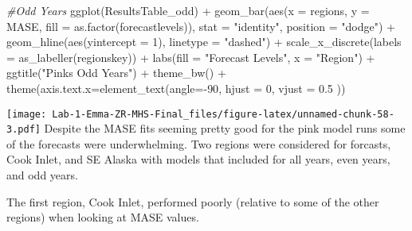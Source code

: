 \documentclass[
]{article}
\newenvironment{Shaded}{\begin{snugshade}}{\end{snugshade}}
\newcommand{\AttributeTok}[1]{\textcolor[rgb]{0.77,0.63,0.00}{#1}}
\newcommand{\CommentTok}[1]{\textcolor[rgb]{0.56,0.35,0.01}{\textit{#1}}}
\newcommand{\DecValTok}[1]{\textcolor[rgb]{0.00,0.00,0.81}{#1}}
\newcommand{\FloatTok}[1]{\textcolor[rgb]{0.00,0.00,0.81}{#1}}
\newcommand{\FunctionTok}[1]{\textcolor[rgb]{0.00,0.00,0.00}{#1}}
\newcommand{\NormalTok}[1]{#1}
\newcommand{\SpecialCharTok}[1]{\textcolor[rgb]{0.00,0.00,0.00}{#1}}
\newcommand{\StringTok}[1]{\textcolor[rgb]{0.31,0.60,0.02}{#1}}
\begin{document}
\begin{Shaded}
\begin{Highlighting}[]
\CommentTok{\#Odd Years }
\FunctionTok{ggplot}\NormalTok{(ResultsTable\_odd) }\SpecialCharTok{+} 
  \FunctionTok{geom\_bar}\NormalTok{(}\FunctionTok{aes}\NormalTok{(}\AttributeTok{x =}\NormalTok{ regions, }\AttributeTok{y =}\NormalTok{ MASE, }\AttributeTok{fill =} \FunctionTok{as.factor}\NormalTok{(forecastlevels)), }\AttributeTok{stat =} \StringTok{"identity"}\NormalTok{, }\AttributeTok{position =} \StringTok{"dodge"}\NormalTok{) }\SpecialCharTok{+} 
  \FunctionTok{geom\_hline}\NormalTok{(}\FunctionTok{aes}\NormalTok{(}\AttributeTok{yintercept =} \DecValTok{1}\NormalTok{), }\AttributeTok{linetype =} \StringTok{"dashed"}\NormalTok{) }\SpecialCharTok{+} 
  \FunctionTok{scale\_x\_discrete}\NormalTok{(}\AttributeTok{labels =} \FunctionTok{as\_labeller}\NormalTok{(regionskey)) }\SpecialCharTok{+}
  \FunctionTok{labs}\NormalTok{(}\AttributeTok{fill =} \StringTok{"Forecast Levels"}\NormalTok{, }\AttributeTok{x =} \StringTok{"Region"}\NormalTok{) }\SpecialCharTok{+} 
  \FunctionTok{ggtitle}\NormalTok{(}\StringTok{"Pinks Odd Years"}\NormalTok{) }\SpecialCharTok{+} \FunctionTok{theme\_bw}\NormalTok{() }\SpecialCharTok{+} \FunctionTok{theme}\NormalTok{(}\AttributeTok{axis.text.x=}\FunctionTok{element\_text}\NormalTok{(}\AttributeTok{angle=}\SpecialCharTok{{-}}\DecValTok{90}\NormalTok{, }\AttributeTok{hjust =} \DecValTok{0}\NormalTok{, }\AttributeTok{vjust =} \FloatTok{0.5}\NormalTok{ ))}
\end{Highlighting}
\end{Shaded}

\texttt{[image: Lab-1-Emma-ZR-MHS-Final\_files/figure-latex/unnamed-chunk-58-3.pdf]}
Despite the MASE fits seeming pretty good for the pink model runs some
of the forecasts were underwhelming. Two regions were considered for
forcasts, Cook Inlet, and SE Alaska with models that included for all
years, even years, and odd years.

The first region, Cook Inlet, performed poorly (relative to some of the
other regions) when looking at MASE values.
\end{document}

